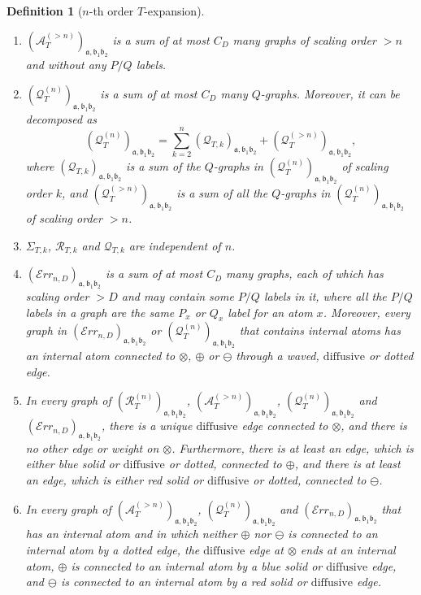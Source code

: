 \documentclass{article}
\newcommand{\1}{\mathds{1}}
\numberwithin{equation}{section}
\newcommand{\be}{\begin{equation}}
\newcommand{\ee}{\end{equation}}
\newcommand{\fa}{{\mathfrak a}}
\newcommand{\fb}{{\mathfrak b}}
\renewcommand{\cal}{\mathcal}
\newcommand{\dashed}{\text{diffusive}}
\theoremstyle{plain} %
\newtheorem{definition}[theorem]{Definition}
\theoremstyle{remark}
\newcommand{\Sdeltak}{{\Sigma}_{T,k}}
\newcommand{\PTn}{\mathcal R_T^{(n)}}
\newcommand{\PTk}{{\mathcal R_{T,k}}}
\newcommand{\QTn}{\mathcal Q_T^{(n)}}
\newcommand{\QTk}{{\mathcal Q_{T,k}}}
\newcommand{\ATn}{\mathcal A_T^{(>n)}}
\newcommand{\Err}{{\mathcal Err}}
\begin{document}
\begin{definition} [$n$-th order $T$-expansion]
\begin{enumerate}
		
		\item  $(\ATn)_{\fa,\fb_1\fb_2}$ is a sum of at most $C_D$ many graphs of scaling order $> n$ and without any  $P/Q$ labels.  
		
		
		\item $(\QTn)_{\fa,\fb_1\fb_2} $ is a sum of at most $C_D$ many $Q$-graphs.  Moreover, it can be decomposed as 
		\be\label{decomposeQ} (\QTn)_{\fa,\fb_1\fb_2}= \sum_{k=2}^{n} (\QTk)_{\fa,\fb_1\fb_2} + (\cal Q^{(>n)}_T)_{\fa,\fb_1\fb_2},\ee
		where  $(\QTk)_{\fa,\fb_1\fb_2}$ is a sum of the $Q$-graphs in $ (\QTn)_{\fa,\fb_1\fb_2}$ of scaling order $k$, and $(\cal Q^{(>n)}_T)_{\fa,\fb_1\fb_2}$ is a sum of all the $Q$-graphs in $ (\QTn)_{\fa,\fb_1\fb_2}$ of scaling order $>n$.
		
		
		
		\item $\Sdeltak$, $\PTk$ and $\QTk$ are independent  of $n$.
		
		\item $(\Err_{n,D})_{\fa,\fb_1\fb_2}$ is a sum of at most $C_D$ many graphs, each of which has scaling order $> D$ and may contain some $P/Q$ labels in it, where all the $P/Q$ labels in a graph are the same $P_x$ or $Q_x$ label for an atom $x$. Moreover, every graph in $(\Err_{n,D})_{\fa,\fb_1\fb_2}$ or $(\QTn)_{\fa,\fb_1\fb_2}$ that contains internal atoms has an internal atom connected to $\otimes$, $\oplus$ or $\ominus$ through a waved, $\dashed$ or dotted edge.

		\item In every graph of $(\PTn)_{\fa,\fb_1\fb_2}$, $(\ATn)_{\fa,\fb_1\fb_2}$, $(\QTn)_{\fa,\fb_1\fb_2} $ and $(\Err_{n,D})_{\fa,\fb_1\fb_2}$,  there is a unique $\dashed$ edge connected to $\otimes$, and there is no other edge or weight on $\otimes$. Furthermore,  there is at least an edge, which is either blue solid or $\dashed$ or dotted,  connected to  $\oplus$, and there is at least an edge, which is either red solid or $\dashed$ or dotted,  connected to $\ominus$.

		\item[(ix$'$)] In every graph of $(\ATn)_{\fa,\fb_1\fb_2}$, $(\QTn)_{\fa,\fb_1\fb_2}$ and $(\Err_{n,D})_{\fa,\fb_1\fb_2}$ that has an internal atom and in which neither $\oplus$ nor $\ominus$ is connected to an internal atom by a dotted edge, the $\dashed$ edge at $\otimes$ ends at an internal atom, $\oplus$ is connected to an internal atom by a blue solid or $\dashed$ edge, and $\ominus$ is connected to an internal atom by a red solid or $\dashed$ edge.


\end{enumerate}
\end{definition}
\end{document}
